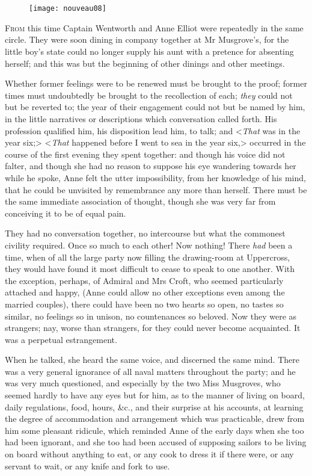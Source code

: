 \chapter[Chapter \thechapter]{}

\begin{figure}[t!]
\centering
\texttt{[image: nouveau08]}
\end{figure}

\lettrine[lraise=0.3]{F}{rom} this time Captain Wentworth and Anne Elliot were repeatedly in the same circle. They were soon dining in company together at Mr Musgrove's, for the little boy's state could no longer supply his aunt with a pretence for absenting herself; and this was but the beginning of other dinings and other meetings.

Whether former feelings were to be renewed must be brought to the proof; former times must undoubtedly be brought to the recollection of each; \textit{they} could not but be reverted to; the year of their engagement could not but be named by him, in the little narratives or descriptions which conversation called forth. His profession qualified him, his disposition lead him, to talk; and <\textit{That} was in the year six;> <\textit{That} happened before I went to sea in the year six,> occurred in the course of the first evening they spent together: and though his voice did not falter, and though she had no reason to suppose his eye wandering towards her while he spoke, Anne felt the utter impossibility, from her knowledge of his mind, that he could be unvisited by remembrance any more than herself. There must be the same immediate association of thought, though she was very far from conceiving it to be of equal pain.

They had no conversation together, no intercourse but what the commonest civility required. Once so much to each other! Now nothing! There \textit{had} been a time, when of all the large party now filling the drawing-room at Uppercross, they would have found it most difficult to cease to speak to one another. With the exception, perhaps, of Admiral and Mrs Croft, who seemed particularly attached and happy, (Anne could allow no other exceptions even among the married couples), there could have been no two hearts so open, no tastes so similar, no feelings so in unison, no countenances so beloved. Now they were as strangers; nay, worse than strangers, for they could never become acquainted. It was a perpetual estrangement.

When he talked, she heard the same voice, and discerned the same mind. There was a very general ignorance of all naval matters throughout the party; and he was very much questioned, and especially by the two Miss Musgroves, who seemed hardly to have any eyes but for him, as to the manner of living on board, daily regulations, food, hours, \&c., and their surprise at his accounts, at learning the degree of accommodation and arrangement which was practicable, drew from him some pleasant ridicule, which reminded Anne of the early days when she too had been ignorant, and she too had been accused of supposing sailors to be living on board without anything to eat, or any cook to dress it if there were, or any servant to wait, or any knife and fork to use.

